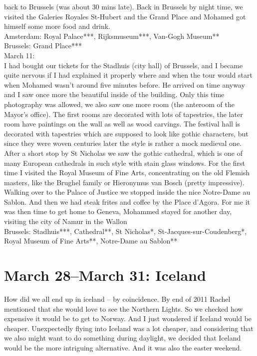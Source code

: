 back to Brussels (was about 30 mins late). Back in Brussels by night time, we visited the Galeries Royales St-Hubert and the Grand Place and Mohamed got himself some more food and drink.\\

Amsterdam: Royal Palace***, Rijksmuseum***, Van-Gogh Museum**\\
Brussels: Grand Place***\\

March 11:\\
I had bought our tickets for the Stadhuis (city hall) of Brussels, and I became quite nervous if I had explained it properly where and when the tour would start when Mohamed wasn't around five minutes before. He arrived on time anyway and I saw once more the beautiful inside of the building. Only this time photography was allowed, we also saw one more room (the anteroom of the Mayor's office). The first rooms are decorated with lots of tapestries, the later room have paintings on the wall as well as wood carvings. The festival hall is decorated with tapestries which are supposed to look like gothic characters, but since they were woven centuries later the style is rather a mock medieval one. After a short stop by St Nicholas we saw the gothic cathedral, which is one of many European cathedrals in such style with stain glass windows. For the first time I visited the Royal Museum of Fine Arts, concentrating on the old Flemish masters, like the Brughel family or Hieronymus van Bosch (pretty impressive). Walking over to the Palace of Justice we stopped inside the nice Notre-Dame au Sablon. And then we had steak frites and coffee by the Place d'Agora. For me it was then time to get home to Geneva, Mohammed stayed for another day, visiting the city of Namur in the Wallon\\

Brussels: Stadhuis***, Cathedral**, St Nicholas*, St-Jacques-sur-Coudenberg*, Royal Museum of Fine Arts**, Notre-Dame au Sablon**

\section{March 28--March 31: Iceland}
\label{2018Iceland}

How did we all end up in iceland -- by coincidence. By end of 2011 Rachel mentioned that she would love to see the Northern Lights. So we checked how expensive it would be to get to Norway. And I just wondered if Iceland would be cheaper. Unexpectedly flying into Iceland was a lot cheaper, and considering that we also might want to do something during daylight, we decided that Iceland would be the more intriguing alternative. And it was also the easter weekend.

